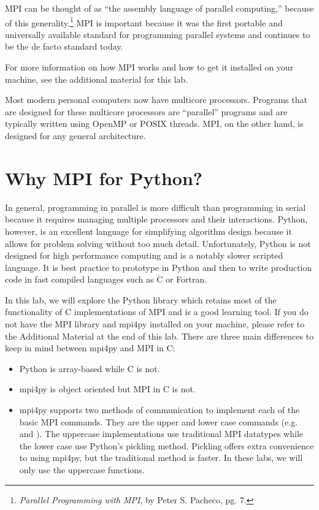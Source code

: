 MPI can be thought of as ``the assembly language of parallel computing,'' because of this generality.\footnote{\emph{Parallel Programming with MPI}, by Peter S. Pacheco, pg. 7.}
MPI is important because it was the first portable and universally available standard for programming parallel systems and continues to be the de facto standard today.

For more information on how MPI works and how to get it installed on your machine, see the additional material for this lab.
\begin{info}
Most modern personal computers now have multicore processors.
Programs that are designed for these multicore processors are ``parallel'' programs and are typically written using OpenMP or POSIX threads.
MPI, on the other hand, is designed for any general architecture.
\end{info}

\section*{Why MPI for Python?}
In general, programming in parallel is more difficult than programming in serial because it requires managing multiple processors and their interactions.
Python, however, is an excellent language for simplifying algorithm design because it allows for problem solving without too much detail.
Unfortunately, Python is not designed for high performance computing and is a notably slower scripted language.
It is best practice to prototype in Python and then to write production code in fast compiled languages such as C or Fortran.

In this lab, we will explore the Python library  which retains most of the functionality of C implementations of MPI and is a good learning tool.
If you do not have the MPI library and mpi4py installed on your machine, please refer to the Additional Material at the end of this lab.
There are three main differences to keep in mind between mpi4py and MPI in C:
\begin{itemize}
    \item Python is array-based while C is not.
    \item mpi4py is object oriented but MPI in C is not.
    \item mpi4py supports two methods of communication to implement each of the basic MPI commands.
    They are the upper and lower case commands (e.g.  and ).
    The uppercase implementations use traditional MPI datatypes while the lower case use
    Python's pickling method. Pickling offers extra convenience to using mpi4py,
    but the traditional method is faster. In these labs, we will only use the uppercase functions.
\end{itemize}


